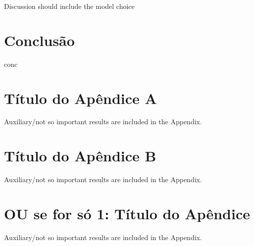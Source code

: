 \documentclass[journal]{IEEEtran}
\begin{document}
Discussion should include the model choice

\section{Conclusão}

conc




\appendices
\section{Título do Apêndice A}
Auxiliary/not so important results are included in the Appendix.

\section{Título do Apêndice B}
Auxiliary/not so important results are included in the Appendix.

\appendix
\section{OU se for só 1: Título do Apêndice}
Auxiliary/not so important results are included in the Appendix.
\end{document}
